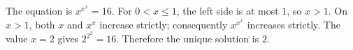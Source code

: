 The equation is $x^{x^x}=16$. For $0<x\le1$, the left side is at most $1$, so $x>1$. On $x>1$, both $x$ and $x^x$ increase strictly; consequently $x^{x^x}$ increases strictly. The value $x=2$ gives $2^{2^2}=16$. Therefore the unique solution is $\boxed2$.
